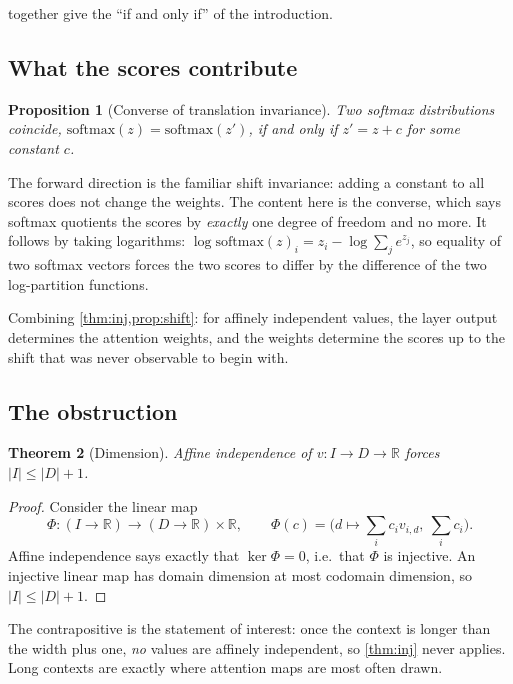 \documentclass[11pt]{article}
\newtheorem{theorem}{Theorem}
\newtheorem{proposition}[theorem]{Proposition}
\newcommand{\R}{\mathbb{R}}
\begin{document}
 together give the ``if and only if'' of the
introduction.

\subsection{What the scores contribute}

\begin{proposition}[Converse of translation invariance]\label{prop:shift}
Two softmax distributions coincide, $\mathrm{softmax}(z) = \mathrm{softmax}(z')$,
if and only if $z' = z + c$ for some constant $c$.
\end{proposition}

The forward direction is the familiar shift invariance: adding a constant to
all scores does not change the weights. The content here is the converse, which
says softmax quotients the scores by \emph{exactly} one degree of freedom and no
more. It follows by taking logarithms: $\log \mathrm{softmax}(z)_i = z_i - \log
\sum_j e^{z_j}$, so equality of two softmax vectors forces the two scores to
differ by the difference of the two log-partition functions.

Combining \cref{thm:inj,prop:shift}: for affinely independent values, the layer
output determines the attention weights, and the weights determine the scores up
to the shift that was never observable to begin with.

\subsection{The obstruction}\label{sec:obstruction}

\begin{theorem}[Dimension]\label{thm:dim}
Affine independence of $v : I \to D \to \R$ forces $|I| \le |D| + 1$.
\end{theorem}

\begin{proof}
Consider the linear map
\[
  \Phi : (I \to \R) \to (D \to \R) \times \R, \qquad
  \Phi(c) = \Big(d \mapsto \sum_i c_i v_{i,d},\ \sum_i c_i\Big).
\]
Affine independence says exactly that $\ker \Phi = 0$, i.e.\ that $\Phi$ is
injective. An injective linear map has domain dimension at most codomain
dimension, so $|I| \le |D| + 1$.
\end{proof}

The contrapositive is the statement of interest: once the context is longer
than the width plus one, \emph{no} values are affinely independent, so
\cref{thm:inj} never applies. Long contexts are exactly where attention maps
are most often drawn.
\end{document}
